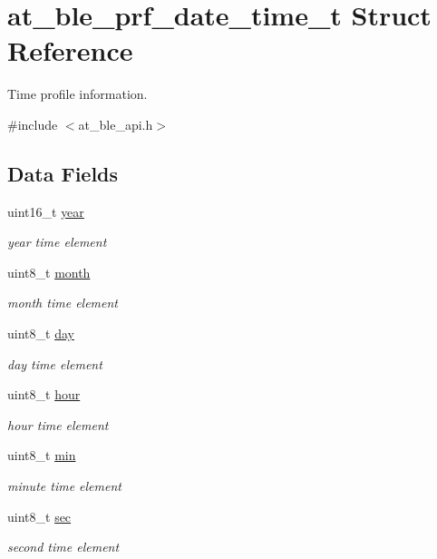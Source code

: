 \hypertarget{structat__ble__prf__date__time__t}{}\section{at\+\_\+ble\+\_\+prf\+\_\+date\+\_\+time\+\_\+t Struct Reference}
\label{structat__ble__prf__date__time__t}


Time profile information.  




{\ttfamily \#include $<$at\+\_\+ble\+\_\+api.\+h$>$}

\subsection*{Data Fields}
\begin{DoxyCompactItemize}
\item 
uint16\+\_\+t \mbox{\hyperlink{structat__ble__prf__date__time__t_a57ca98d8f6d4baf0fe41c583c7dcb0d5}{year}}
\begin{DoxyCompactList}\small\item\em year time element \end{DoxyCompactList}\item 
uint8\+\_\+t \mbox{\hyperlink{structat__ble__prf__date__time__t_a3e00faf7fbf9805e9ec4d2edd6339050}{month}}
\begin{DoxyCompactList}\small\item\em month time element \end{DoxyCompactList}\item 
uint8\+\_\+t \mbox{\hyperlink{structat__ble__prf__date__time__t_a72369a1087b2aeffe374bb054cb97c12}{day}}
\begin{DoxyCompactList}\small\item\em day time element \end{DoxyCompactList}\item 
uint8\+\_\+t \mbox{\hyperlink{structat__ble__prf__date__time__t_ae5af4ff48939d13d480f87e56a9385d6}{hour}}
\begin{DoxyCompactList}\small\item\em hour time element \end{DoxyCompactList}\item 
uint8\+\_\+t \mbox{\hyperlink{structat__ble__prf__date__time__t_ac9b481208b43f7c37ed25e446bdec692}{min}}
\begin{DoxyCompactList}\small\item\em minute time element \end{DoxyCompactList}\item 
uint8\+\_\+t \mbox{\hyperlink{structat__ble__prf__date__time__t_ad1696900026b287a87c563b733a21bc3}{sec}}
\begin{DoxyCompactList}\small\item\em second time element \end{DoxyCompactList}\end{DoxyCompactItemize}


